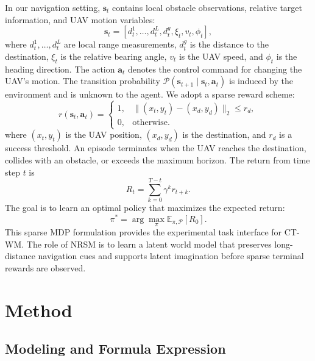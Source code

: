 \documentclass{article}
\begin{document}
In our navigation setting, $\mathbf s_t$ contains local obstacle observations, relative target information, and UAV motion variables:
\begin{equation}
\mathbf s_t
=
[d_t^1,\ldots,d_t^L,d_t^g,\xi_t,v_t,\phi_t],
\label{eq:uav_state}
\end{equation}
where $d_t^1,\ldots,d_t^L$ are local range measurements, $d_t^g$ is the distance to the destination, $\xi_t$ is the relative bearing angle, $v_t$ is the UAV speed, and $\phi_t$ is the heading direction. The action $\mathbf a_t$ denotes the control command for changing the UAV's motion. The transition probability $\mathcal P(\mathbf s_{t+1}\mid\mathbf s_t,\mathbf a_t)$ is induced by the environment and is unknown to the agent. We adopt a sparse reward scheme:
\begin{equation}
r(\mathbf s_t,\mathbf a_t)
=
\begin{cases}
1, & \|(x_t,y_t)-(x_d,y_d)\|_2\le r_d,\\
0, & \text{otherwise}.
\end{cases}
\label{eq:uav_sparse_reward}
\end{equation}
where $(x_t,y_t)$ is the UAV position, $(x_d,y_d)$ is the destination, and $r_d$ is a success threshold. An episode terminates when the UAV reaches the destination, collides with an obstacle, or exceeds the maximum horizon. The return from time step $t$ is
\begin{equation}
R_t
=
\sum_{k=0}^{T-t}
\gamma^k r_{t+k}.
\label{eq:uav_return}
\end{equation}
The goal is to learn an optimal policy that maximizes the expected return:
\begin{equation}
\pi^*
=
\arg\max_{\pi}
\mathbb E_{\pi,\mathcal P}[R_0].
\label{eq:uav_return_objective}
\end{equation}
This sparse MDP formulation provides the experimental task interface for CT-WM. The role of NRSM is to learn a latent world model that preserves long-distance navigation cues and supports latent imagination before sparse terminal rewards are observed.

\section{Method}

\subsection{Modeling and Formula Expression}
\end{document}
